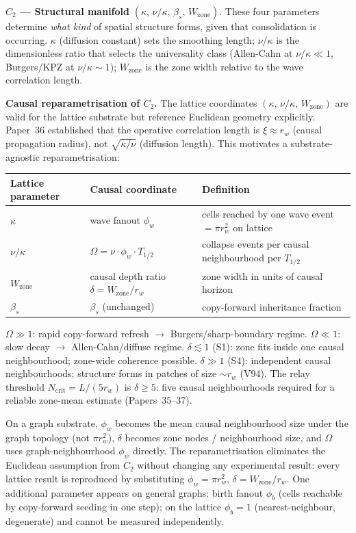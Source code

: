 \documentclass[11pt]{article}
\begin{document}
\medskip
\textbf{$C_2$ --- Structural manifold} $(\kappa,\, \nu/\kappa,\, \beta_s,\, W_\mathrm{zone})$.
These four parameters determine \emph{what kind} of spatial structure forms,
given that consolidation is occurring.
$\kappa$ (diffusion constant) sets the smoothing length; $\nu/\kappa$ is the
dimensionless ratio that selects the universality class (Allen-Cahn at $\nu/\kappa \ll 1$,
Burgers/KPZ at $\nu/\kappa \sim 1$); $W_\mathrm{zone}$ is the zone width relative
to the wave correlation length.

\medskip
\textbf{Causal reparametrisation of $C_2$.}
The lattice coordinates $(\kappa,\, \nu/\kappa,\, W_\mathrm{zone})$ are valid for the
lattice substrate but reference Euclidean geometry explicitly.
Paper~36 established that the operative correlation length is $\xi \approx r_w$
(causal propagation radius), not $\sqrt{\kappa/\nu}$ (diffusion length).
This motivates a substrate-agnostic reparametrisation:

\begin{center}
\begin{tabular}{lll}
\toprule
\textbf{Lattice parameter} & \textbf{Causal coordinate} & \textbf{Definition} \\
\midrule
$\kappa$ & wave fanout $\phi_w$ & cells reached by one wave event $= \pi r_w^2$ on lattice \\
$\nu/\kappa$ & $\Omega = \nu \cdot \phi_w \cdot T_{1/2}$ & collapse events per causal neighbourhood per $T_{1/2}$ \\
$W_\mathrm{zone}$ & causal depth ratio $\delta = W_\mathrm{zone}/r_w$ & zone width in units of causal horizon \\
$\beta_s$ & $\beta_s$ (unchanged) & copy-forward inheritance fraction \\
\bottomrule
\end{tabular}
\end{center}

$\Omega \gg 1$: rapid copy-forward refresh $\to$ Burgers/sharp-boundary regime.
$\Omega \ll 1$: slow decay $\to$ Allen-Cahn/diffuse regime.
$\delta \lesssim 1$ (S1): zone fits inside one causal neighbourhood; zone-wide coherence possible.
$\delta \gg 1$ (S4): independent causal neighbourhoods; structure forms in patches of size $\sim r_w$ (V94).
The relay threshold $N_\mathrm{crit} = L/(5r_w)$ is $\delta \geq 5$: five causal neighbourhoods
required for a reliable zone-mean estimate (Papers~35--37).

On a graph substrate, $\phi_w$ becomes the mean causal neighbourhood size under the graph topology
(not $\pi r_w^2$), $\delta$ becomes zone nodes / neighbourhood size, and $\Omega$ uses
graph-neighbourhood $\phi_w$ directly.
The reparametrisation eliminates the Euclidean assumption from $C_2$ without changing
any experimental result: every lattice result is reproduced by substituting
$\phi_w = \pi r_w^2$, $\delta = W_\mathrm{zone}/r_w$.
One additional parameter appears on general graphs:
birth fanout $\phi_b$ (cells reachable by copy-forward seeding in one step);
on the lattice $\phi_b = 1$ (nearest-neighbour, degenerate) and cannot be measured independently.
\end{document}
